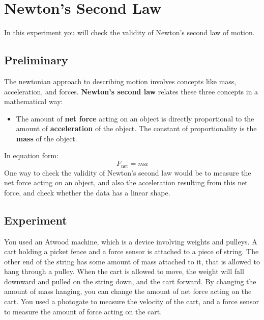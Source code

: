 \setcounter{chapter}{3}
\chapter{Newton's Second Law}
In this experiment you will check the validity of Newton's second law of motion.
\section{Preliminary}
The newtonian approach to describing motion involves concepts like mass, acceleration, and forces. \textbf{Newton's second law} relates these three concepts in a mathematical way:
\begin{itemize}
    \item The amount of \textbf{net force} acting on an object is directly proportional to the amount of \textbf{acceleration} of the object. The constant of proportionality is the \textbf{mass} of the object.
\end{itemize}
In equation form:
\begin{equation}
    F_{\text{net}} = m a
    \label{eq:04.Fma}
\end{equation}
One way to check the validity of Newton's second law would be to measure the net force acting on an object, and also the acceleration resulting from this net force, and check whether the data has a linear shape.
\section{Experiment}
You used an Atwood machine, which is a device involving weights and pulleys. A cart holding a picket fence and a force sensor is attached to a piece of string. The other end of the string has some amount of mass attached to it, that is allowed to hang through a pulley. When the cart is allowed to move, the weight will fall downward and pulled on the string down, and the cart forward. By changing the amount of mass hanging, you can change the amount of net force acting on the cart. You used a photogate to measure the velocity of the cart, and a force sensor to measure the amount of force acting on the cart.

